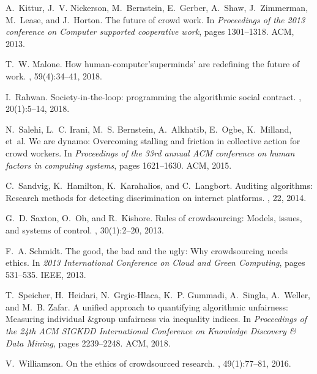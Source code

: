 \documentclass[11pt]{article}
\begin{document}
\begin{thebibliography}{10}
	A.~Kittur, J.~V. Nickerson, M.~Bernstein, E.~Gerber, A.~Shaw, J.~Zimmerman,
	M.~Lease, and J.~Horton.
	\newblock The future of crowd work.
	\newblock In {\em Proceedings of the 2013 conference on Computer supported
		cooperative work}, pages 1301--1318. ACM, 2013.
	
	T.~W. Malone.
	\newblock How human-computer’superminds’ are redefining the future of work.
	, 59(4):34--41, 2018.
	
	I.~Rahwan.
	\newblock Society-in-the-loop: programming the algorithmic social contract.
	, 20(1):5--14, 2018.
	
	N.~Salehi, L.~C. Irani, M.~S. Bernstein, A.~Alkhatib, E.~Ogbe, K.~Milland,
	et~al.
	\newblock We are dynamo: Overcoming stalling and friction in collective action
	for crowd workers.
	\newblock In {\em Proceedings of the 33rd annual ACM conference on human
		factors in computing systems}, pages 1621--1630. ACM, 2015.
	
	C.~Sandvig, K.~Hamilton, K.~Karahalios, and C.~Langbort.
	\newblock Auditing algorithms: Research methods for detecting discrimination on
	internet platforms.
	, 22, 2014.
	
	G.~D. Saxton, O.~Oh, and R.~Kishore.
	\newblock Rules of crowdsourcing: Models, issues, and systems of control.
	, 30(1):2--20, 2013.
	
	F.~A. Schmidt.
	\newblock The good, the bad and the ugly: Why crowdsourcing needs ethics.
	\newblock In {\em 2013 International Conference on Cloud and Green Computing},
	pages 531--535. IEEE, 2013.
	
	T.~Speicher, H.~Heidari, N.~Grgic-Hlaca, K.~P. Gummadi, A.~Singla, A.~Weller,
	and M.~B. Zafar.
	\newblock A unified approach to quantifying algorithmic unfairness: Measuring
	individual \&group unfairness via inequality indices.
	\newblock In {\em Proceedings of the 24th ACM SIGKDD International Conference
		on Knowledge Discovery \& Data Mining}, pages 2239--2248. ACM, 2018.
	
	V.~Williamson.
	\newblock On the ethics of crowdsourced research.
	, 49(1):77--81, 2016.
	
\end{thebibliography}






\end{document}
